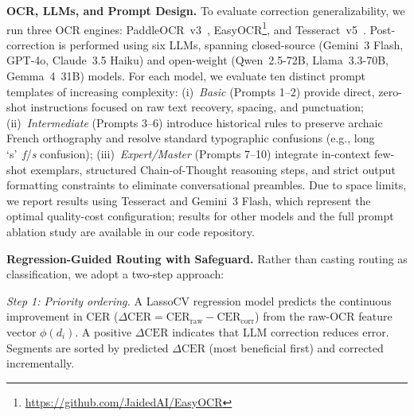 \documentclass[sigconf]{acmart}
\begin{document}
\medskip\noindent\textbf{OCR, LLMs, and Prompt Design.}
To evaluate correction generalizability, we run three OCR engines: PaddleOCR~v3~\cite{cui2025paddleocr}, EasyOCR\footnote{\url{https://github.com/JaidedAI/EasyOCR}}, and Tesseract~v5~\cite{tesseractOCR}. Post-correction is performed using six LLMs, spanning closed-source (Gemini~3 Flash, GPT-4o, Claude~3.5 Haiku)\cite{google2025gemini3flash,openai2024gpt4osystemcard, anthropic2024claude35haiku} and open-weight (Qwen~2.5-72B, Llama~3.3-70B, Gemma~4~31B) \cite{qwen2024qwen25,meta2024llama33,google2026gemma4} models. For each model, we evaluate ten distinct prompt templates of increasing complexity: (i)~\emph{Basic} (Prompts 1--2) provide direct, zero-shot instructions focused on raw text recovery, spacing, and punctuation; (ii)~\emph{Intermediate} (Prompts 3--6) introduce historical rules to preserve archaic French orthography and resolve standard typographic confusions (e.g., long `s'~\textit{f}/\textit{s} confusion); (iii)~\emph{Expert/Master} (Prompts 7--10) integrate in-context few-shot exemplars, structured Chain-of-Thought reasoning steps, and strict output formatting constraints to eliminate conversational preambles. Due to space limits, we report results using Tesseract and Gemini~3 Flash, which represent the optimal quality-cost configuration; results for other models and the full prompt ablation study are available in our code repository.



\medskip\noindent\textbf{Regression-Guided Routing with Safeguard.}
Rather than casting routing as classification, we adopt a two-step approach:

\smallskip\noindent\emph{Step 1: Priority ordering.}
A LassoCV regression model predicts the continuous improvement in CER ($\Delta\text{CER} = \text{CER}_{\text{raw}} - \text{CER}_{\text{corr}}$) from the raw-OCR feature vector $\phi(d_i)$. A positive $\Delta\text{CER}$ indicates that LLM correction reduces error. Segments are sorted by predicted $\Delta\text{CER}$ (most beneficial first) and corrected incrementally.
\end{document}
